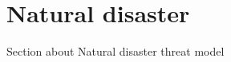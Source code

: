 \section{Natural disaster}
Section about Natural disaster threat model \cite{taylor2012,lawson2012,bird2012}
